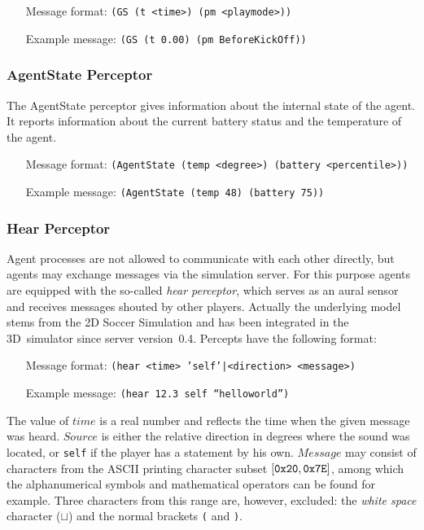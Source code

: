 \begin{itemize}
	\item[Message format:] \texttt{(GS (t <time>) (pm <playmode>))}
	\item[Example message:] \texttt{(GS (t 0.00) (pm BeforeKickOff))}
\end{itemize}

\subsubsection{AgentState Perceptor}
\label{sec:agentstateperceptor}

The AgentState perceptor gives information about the internal state of
the agent. It reports information about the current battery status and
the temperature of the agent.

\begin{itemize}
	\item[Message format:] \texttt{(AgentState (temp <degree>) (battery <percentile>))}
	\item[Example message:] \texttt{(AgentState (temp 48) (battery 75))}
\end{itemize}

\subsubsection{Hear Perceptor}
\label{sec:hearperceptor}
Agent processes are not allowed to communicate with each other directly, but
agents may exchange messages via the simulation server. For this purpose
agents are equipped with the so-called \emph{hear perceptor}, which serves as
an aural sensor and receives messages shouted by other players. Actually the
underlying model stems from the 2D Soccer Simulation and has been integrated 
in the 3D~simulator since server version~0.4. Percepts have the following format:
\begin{itemize}
	\item[Message format:] \texttt{(hear <time>	'self'|<direction> <message>)} 
	\item[Example message:]	\texttt{(hear 12.3 self ``helloworld'')}
\end{itemize}
The value of $time$ is a real number and reflects the time when the given
message was heard. ${S}ource$ is either the relative direction in degrees
where the sound was located, or {\tt self} if the player has a statement by
his own. $Message$ may consist of characters from the ASCII printing character
subset \mbox{$[{\tt 0x20}, {\tt 0x7E]}$}, among which the alphanumerical
symbols and mathematical operators can be found for example. Three characters
from this range are, however, excluded: the {\it white space} character
($\sqcup$) and the normal brackets {\tt(} and {\tt )}.

